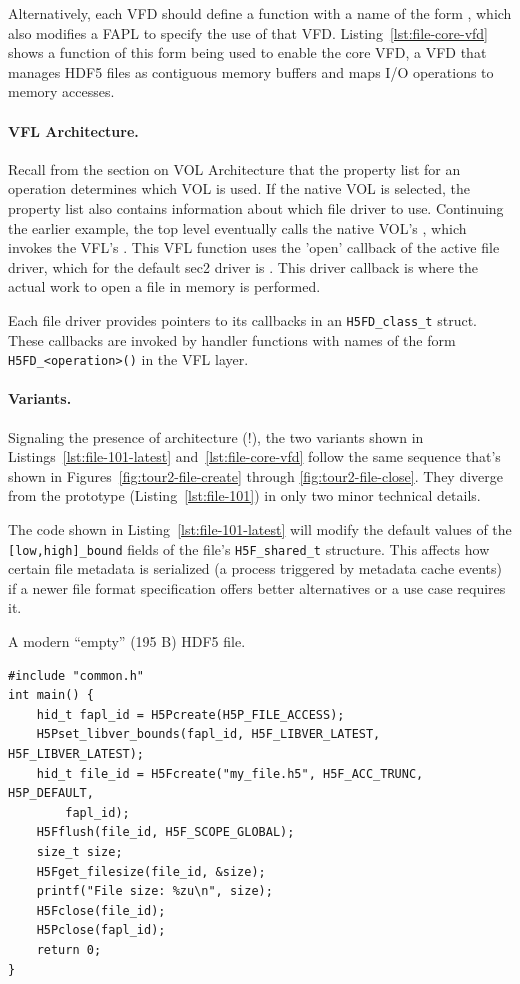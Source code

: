 Alternatively, each VFD should define a function with a name of the form , which also modifies a FAPL to specify the use of that VFD. Listing~\ref{lst:file-core-vfd} shows a function of this form being used to enable the core VFD, a VFD that manages HDF5 files as contiguous memory buffers and maps I/O operations to memory accesses.

\paragraph{VFL Architecture.} Recall from the section on VOL Architecture that the property list for an operation determines which VOL is used. If the native VOL is selected, the property list also contains information about which file driver to use. Continuing the earlier example, the top level  eventually calls the native VOL's , which invokes the VFL's . This VFL function uses the 'open' callback of the active file driver, which for the default sec2 driver is . This driver callback is where the actual work to open a file in memory is performed.

Each file driver provides pointers to its callbacks in an \texttt{H5FD\_class\_t} struct. These callbacks are invoked by handler functions with names of the form \texttt{H5FD\_<operation>()} in the VFL layer. %

\paragraph{Variants.} Signaling the presence of architecture (!), the two variants shown in Listings~\ref{lst:file-101-latest} and~\ref{lst:file-core-vfd} follow the same sequence that's shown in Figures~\ref{fig:tour2-file-create} through \ref{fig:tour2-file-close}. They diverge from the prototype (Listing~\ref{lst:file-101}) in only two minor technical details.

The code shown in Listing~\ref{lst:file-101-latest} will modify the default values of the \texttt{[low,high]\_bound} fields of the file's \texttt{H5F\_shared\_t} structure. This affects how certain file metadata is serialized (a process triggered by metadata cache events) if a newer file format specification offers better alternatives or a use case requires it.

\begin{listing}
\centering
\caption{A modern ``empty'' (195 B) HDF5 file.}
\label{lst:file-101-latest}
\begin{verbatim}
#include "common.h"
int main() {
    hid_t fapl_id = H5Pcreate(H5P_FILE_ACCESS);
    H5Pset_libver_bounds(fapl_id, H5F_LIBVER_LATEST, H5F_LIBVER_LATEST);
    hid_t file_id = H5Fcreate("my_file.h5", H5F_ACC_TRUNC, H5P_DEFAULT,
        fapl_id);
    H5Fflush(file_id, H5F_SCOPE_GLOBAL);
    size_t size;
    H5Fget_filesize(file_id, &size);
    printf("File size: %zu\n", size);
    H5Fclose(file_id);
    H5Pclose(fapl_id);
    return 0;
}
\end{verbatim}
\end{listing}

